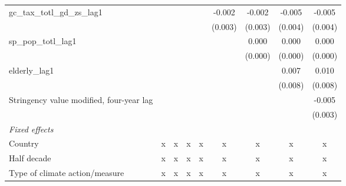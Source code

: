 \begin{tabular}{lcccccccc}
   gc\_tax\_totl\_gd\_zs\_lag1                                                        &             &             &             &             & -0.002  & -0.002  & -0.005        & -0.005\\   
                                                                                      &             &             &             &             & (0.003) & (0.003) & (0.004)       & (0.004)\\   
   sp\_pop\_totl\_lag1                                                                &             &             &             &             &         & 0.000   & 0.000         & 0.000\\   
                                                                                      &             &             &             &             &         & (0.000) & (0.000)       & (0.000)\\   
   elderly\_lag1                                                                      &             &             &             &             &         &         & 0.007         & 0.010\\   
                                                                                      &             &             &             &             &         &         & (0.008)       & (0.008)\\   
   Stringency value modified, four-year lag                                           &             &             &             &             &         &         &               & -0.005\\   
                                                                                      &             &             &             &             &         &         &               & (0.003)\\   
   \emph{Fixed effects}\\
   Country                                                                            & x           & x           & x           & x           & x       & x       & x             & x\\  
   Half decade                                                                        & x           & x           & x           & x           & x       & x       & x             & x\\  
   Type of climate action/measure                                                     & x           & x           & x           & x           & x       & x       & x             & x\\  

\end{tabular}
